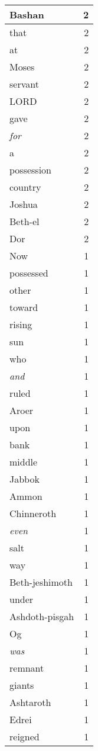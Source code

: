 \begin{center}
\begin{longtable}{l|r}
Bashan & 2 \\ \hline
that & 2 \\ \hline
at & 2 \\ \hline
Moses & 2 \\ \hline
servant & 2 \\ \hline
LORD & 2 \\ \hline
gave & 2 \\ \hline
\emph{for} & 2 \\ \hline
a & 2 \\ \hline
possession & 2 \\ \hline
country & 2 \\ \hline
Joshua & 2 \\ \hline
Beth-el & 2 \\ \hline
Dor & 2 \\ \hline
Now & 1 \\ \hline
possessed & 1 \\ \hline
other & 1 \\ \hline
toward & 1 \\ \hline
rising & 1 \\ \hline
sun & 1 \\ \hline
who & 1 \\ \hline
\emph{and} & 1 \\ \hline
ruled & 1 \\ \hline
Aroer & 1 \\ \hline
upon & 1 \\ \hline
bank & 1 \\ \hline
middle & 1 \\ \hline
Jabbok & 1 \\ \hline
Ammon & 1 \\ \hline
Chinneroth & 1 \\ \hline
\emph{even} & 1 \\ \hline
salt & 1 \\ \hline
way & 1 \\ \hline
Beth-jeshimoth & 1 \\ \hline
under & 1 \\ \hline
Ashdoth-pisgah & 1 \\ \hline
Og & 1 \\ \hline
\emph{was} & 1 \\ \hline
remnant & 1 \\ \hline
giants & 1 \\ \hline
Ashtaroth & 1 \\ \hline
Edrei & 1 \\ \hline
reigned & 1 \\ \hline

\end{longtable}
\end{center}
